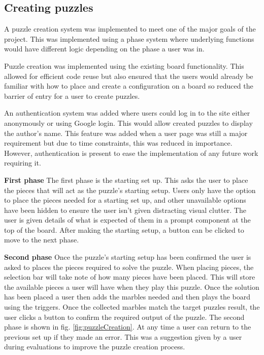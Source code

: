 \documentclass{l4proj}
\begin{document}
\subsection{Creating puzzles}
A puzzle creation system was implemented to meet one of the major goals of the project. This was implemented using a phase system where underlying functions would have different logic depending on the phase a user was in. 

Puzzle creation was implemented using the existing board functionality. This allowed for efficient code reuse but also ensured that the users would already be familiar with how to place and create a configuration on a board so reduced the barrier of entry for a user to create puzzles.

An authentication system was added where users could log in to the site either anonymously or using Google login. This would allow created puzzles to display the author's name. This feature was added when a user page was still a major requirement but due to time constraints, this was reduced in importance. However, authentication is present to ease the implementation of any future work requiring it.

\textbf{First phase}
The first phase is the starting set up. This asks the user to place the pieces that will act as the puzzle's starting setup. Users only have the option to place the pieces needed for a starting set up, and other unavailable options have been hidden to ensure the user isn't given distracting visual clutter. The user is given details of what is expected of them in a prompt component at the top of the board. After making the starting setup, a button can be clicked to move to the next phase. 

\textbf{Second phase}
Once the puzzle's starting setup has been confirmed the user is asked to places the pieces required to solve the puzzle. When placing pieces, the selection bar will take note of how many pieces have been placed. This will store the available pieces a user will have when they play this puzzle. Once the solution has been placed a user then adds the marbles needed and then plays the board using the triggers. Once the collected marbles match the target puzzles result, the user clicks a button to confirm the required output of the puzzle. The second phase is shown in fig. \ref{fig:puzzleCreation}. At any time a user can return to the previous set up if they made an error. This was a suggestion given by a user during evaluations to improve the puzzle creation process.
\end{document}
